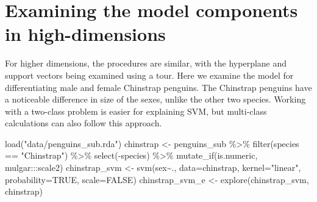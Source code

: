 \documentclass[
  letterpaper,
]{krantz}
\newenvironment{Shaded}{\begin{snugshade}}{\end{snugshade}}
\newcommand{\AttributeTok}[1]{\textcolor[rgb]{0.40,0.45,0.13}{#1}}
\newcommand{\ConstantTok}[1]{\textcolor[rgb]{0.56,0.35,0.01}{#1}}
\newcommand{\FunctionTok}[1]{\textcolor[rgb]{0.28,0.35,0.67}{#1}}
\newcommand{\NormalTok}[1]{\textcolor[rgb]{0.00,0.23,0.31}{#1}}
\newcommand{\OtherTok}[1]{\textcolor[rgb]{0.00,0.23,0.31}{#1}}
\newcommand{\SpecialCharTok}[1]{\textcolor[rgb]{0.37,0.37,0.37}{#1}}
\newcommand{\StringTok}[1]{\textcolor[rgb]{0.13,0.47,0.30}{#1}}
\begin{document}
\section{Examining the model components in
high-dimensions}\label{sec-svm-model}

For higher dimensions, the procedures are similar, with the hyperplane
and support vectors being examined using a tour. Here we examine the
model for differentiating male and female Chinstrap penguins. The
Chinstrap penguins have a noticeable difference in size of the sexes,
unlike the other two species. Working with a two-class problem is easier
for explaining SVM, but multi-class calculations can also follow this
approach.

\begin{Shaded}
\begin{Highlighting}[]
\FunctionTok{load}\NormalTok{(}\StringTok{"data/penguins\_sub.rda"}\NormalTok{)}
\NormalTok{chinstrap }\OtherTok{\textless{}{-}}\NormalTok{ penguins\_sub }\SpecialCharTok{\%\textgreater{}\%}
  \FunctionTok{filter}\NormalTok{(species }\SpecialCharTok{==} \StringTok{"Chinstrap"}\NormalTok{) }\SpecialCharTok{\%\textgreater{}\%}
  \FunctionTok{select}\NormalTok{(}\SpecialCharTok{{-}}\NormalTok{species) }\SpecialCharTok{\%\textgreater{}\%}
  \FunctionTok{mutate\_if}\NormalTok{(is.numeric, mulgar}\SpecialCharTok{:::}\NormalTok{scale2)}
\NormalTok{chinstrap\_svm }\OtherTok{\textless{}{-}} \FunctionTok{svm}\NormalTok{(sex}\SpecialCharTok{\textasciitilde{}}\NormalTok{., }\AttributeTok{data=}\NormalTok{chinstrap, }
                     \AttributeTok{kernel=}\StringTok{"linear"}\NormalTok{,}
                     \AttributeTok{probability=}\ConstantTok{TRUE}\NormalTok{, }
                     \AttributeTok{scale=}\ConstantTok{FALSE}\NormalTok{)}
\NormalTok{chinstrap\_svm\_e }\OtherTok{\textless{}{-}} \FunctionTok{explore}\NormalTok{(chinstrap\_svm, chinstrap)}
\end{Highlighting}
\end{Shaded}
\end{document}

